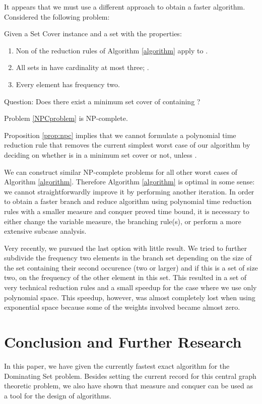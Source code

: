 \documentclass[fleqn]{stacs_proc}
\begin{document}
It appears that we must use a different approach to obtain a faster algorithm. 
Considered the following problem:
\begin{problem} \label{NPCproblem}
Given a {\sc Set Cover} instance  and a set  with the properties:
\begin{enumerate}
\item Non of the reduction rules of Algorithm \ref{algorithm} apply to .
\item All sets in  have cardinality at most three; .
\item Every element  has frequency two.
\end{enumerate}
Question: Does there exist a minimum set cover of  containing ?
\end{problem}

\begin{proposition} \label{prop:npc}
Problem \ref{NPCproblem} is NP-complete.
\end{proposition}

Proposition \ref{prop:npc} implies that we cannot formulate a polynomial time reduction rule that removes the
current simplest worst case of our algorithm by deciding on whether  is in a minimum set cover or not, unless .

We can construct similar NP-complete problems for all other worst cases of Algorithm \ref{algorithm}.
Therefore Algorithm \ref{algorithm} is optimal in some sense:
we cannot straightforwardly improve it by performing another iteration.
In order to obtain a faster branch and reduce algorithm using polynomial time reduction rules 
with a smaller measure and conquer proved time bound,
it is necessary to either change the variable measure, the branching rule(s),
or perform a more extensive subcase analysis.

Very recently, we pursued the last option with little result.
We tried to further subdivide the frequency two elements in the branch set
depending on the size of the set containing their second occurence (two or larger) and
if this is a set of size two, on the frequency of the other element in this set.
This resulted in a set of very technical reduction rules
and a small speedup for the case where we use only polynomial space.
This speedup, however, was almost completely lost when using exponential space
because some of the weights involved became almost zero.







\section{Conclusion and Further Research}
In this paper, we have given the currently fastest exact algorithm for the {\sc Dominating Set}
problem. Besides setting the current record for this central graph theoretic problem, we also
have shown that measure and conquer can be used as a tool for the design of algorithms.
\end{document}
